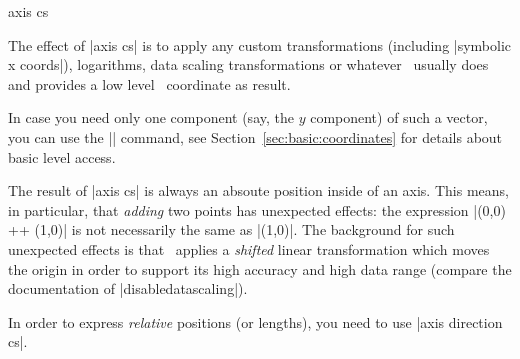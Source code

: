 \begin{coordinatesystem}{axis cs}
\begin{codeexample}[]
\end{codeexample}

The effect of |axis cs| is to apply any custom transformations (including |symbolic x coords|), logarithms, data scaling transformations or whatever \PGFPlots\ usually does and provides a low level \pgfname\ coordinate as result.

In case you need only one component (say, the $y$ component) of such a vector, you can use the |\pgfplotstransformcoordinatey| command, see Section~\ref{sec:basic:coordinates} for details about basic level access.

The result of |axis cs| is always an absoute position inside of an axis. This means, in particular, that \emph{adding} two points has unexpected effects: the expression |(0,0) ++ (1,0)| is not necessarily the same as |(1,0)|. The background for such unexpected effects is that \PGFPlots\ applies a \emph{shifted} linear transformation which moves the origin in order to support its high accuracy and high data range (compare the documentation of |disabledatascaling|).

In order to express \emph{relative} positions (or lengths), you need to use |axis direction cs|.
\end{coordinatesystem}

